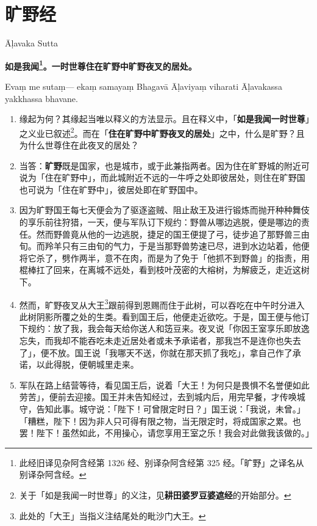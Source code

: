 \section{旷野经}

\begin{center}Āḷavaka Sutta\end{center}\vspace{1em}

\textbf{如是我闻\footnote{此经旧译见杂阿含经第 1326 经、别译杂阿含经第 325 经。「旷野」之译名从别译杂阿含经。}。一时世尊住在旷野中旷野夜叉的居处。}

Evaṃ me sutaṃ— ekaṃ samayaṃ Bhagavā Āḷaviyaṃ viharati Āḷavakassa yakkhassa bhavane.

\begin{enumerate}\item 缘起为何？其缘起当唯以释义的方法显示。且在释义中，「\textbf{如是我闻一时世尊}」之义业已叙述\footnote{关于「如是我闻一时世尊」的义注，见\textbf{耕田婆罗豆婆遮经}的开始部分。}。而在「\textbf{住在旷野中旷野夜叉的居处}」之中，什么是旷野？且为什么世尊住在此夜叉的居处？
\item 当答：\textbf{旷野}既是国家，也是城市，或于此兼指两者。因为住在旷野城的附近可说为「住在旷野中」，而此城附近不远的一牛呼之处即彼居处，则住在旷野国也可说为「住在旷野中」，彼居处即在旷野国中。
\item 因为旷野国王每七天便会为了驱逐盗贼、阻止敌王及进行锻炼而抛开种种舞伎的享乐前往狩猎，一天，便与军队订下规约：野兽从哪边逃脱，便是哪边的责任。然而野兽竟从他的一边逃脱，捷足的国王便提了弓，徒步追了那野兽三由旬。而羚羊只有三由旬的气力，于是当那野兽势速已尽，进到水边站着，他便将它杀了，劈作两半，意不在肉，而是为了免于「他抓不到野兽」的指责，用棍棒扛了回来，在离城不远处，看到枝叶茂密的大榕树，为解疲乏，走近这树下。
\item 然而，旷野夜叉从大王\footnote{此处的「大王」当指义注结尾处的毗沙门大王。}跟前得到恩赐而住于此树，可以吞吃在中午时分进入此树阴影所覆之处的生类。看到国王后，他便走近欲吃。于是，国王便与他订下规约：放了我，我会每天给你送人和笾豆来。夜叉说「你因王室享乐即放逸忘失，而我却不能吞吃未走近居处者或未予承诺者，那我岂不是连你也失去了」，便不放。国王说「我哪天不送，你就在那天抓了我吃」，拿自己作了承诺，以此得脱，便朝城里走来。
\item 军队在路上结营等待，看见国王后，说着「大王！为何只是畏惧不名誉便如此劳苦」，便前去迎接。国王并未告知经过，去到城内后，用完早餐，才传唤城守，告知此事。城守说：「陛下！可曾限定时日？」国王说：「我说，未曾。」「糟糕，陛下！因为非人只可得有限之物，当无限定时，将成国家之累。也罢！陛下！虽然如此，不用操心，请您享用王室之乐！我会对此做我该做的。」

\end{enumerate}
